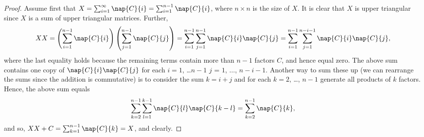  \begin{proof}
   Assume first that $X = \sum_{i = 1}^\infty \nap{C}{i}= \sum_{i = 1}^{n-1}\nap{C}{i}$, where $n \times n$ is the size of $X$. It is clear that $X$ is upper triangular since $X$ is a sum of upper triangular matrices. Further, 
   \begin{equation*}
     X X = 
     \left(\sum_{i = 1}^{n-1}\nap{C}{i}\right)\left(\sum_{j = 1}^{n-1}\nap{C}{j}\right) =
     \sum_{i = 1}^{n - 1}\sum_{j = 1}^{n-1}\nap{C}{i}\nap{C}{j} = 
     \sum_{i = 1}^{n - 1}\sum_{j = 1}^{n - i - 1}\nap{C}{i}\nap{C}{j},
   \end{equation*}
   where the last equality holds because the remaining terms contain more than $n-1$ factors $C$, and hence equal zero.
   The above sum contains one copy of $\nap{C}{i}\nap{C}{j}$ for each $i = 1$, \ldots $n-1$ $j$ = $1$, $\ldots$, $n - i -1$. 
   Another way to sum these up (we can rearrange the sums since the addition is commutative) is to consider the sum $k = i + j$ and for each $k = 2$, \ldots, $n-1$ generate all products of $k$ factors. Hence, the above sum equals
   \begin{equation*}
     \sum_{k = 2}^{n-1}\sum_{l = 1}^{k-1}\nap{C}{l}\nap{C}{k-l} = \sum_{k = 2}^{n-1}\nap{C}{k},
   \end{equation*}
   and so, $XX + C = \sum_{k = 1}^{n-1}\nap{C}{k} = X$, and clearly.


\end{proof}
